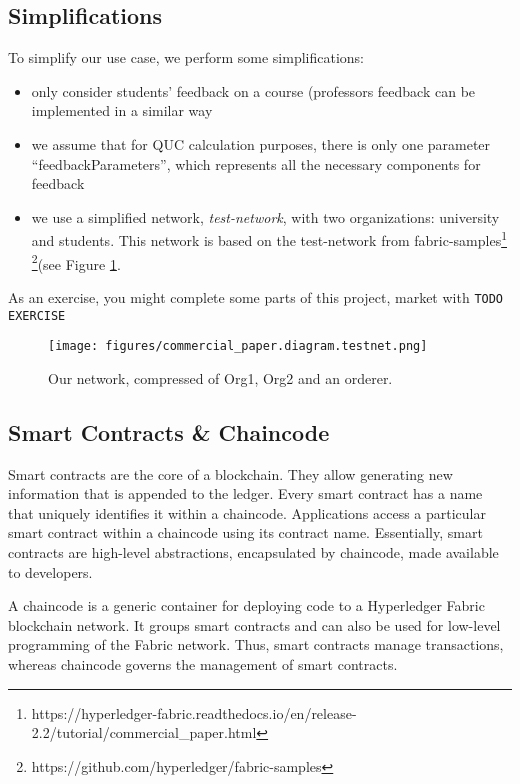 \documentclass[12pt,a4paper]{article}
\theoremstyle{definition}
\begin{document}
    \subsection{Simplifications}
    To simplify our use case, we perform some simplifications:

    \begin{itemize}
        \item  only consider students' feedback on a course (professors feedback can be implemented in a similar way
        \item we assume that for QUC calculation purposes, there is only one parameter ``feedbackParameters'', which represents all the necessary components for feedback
        \item we use a simplified network, \emph{test-network}, with two organizations: university and students. This network is based on the test-network from fabric-samples\footnote{https://hyperledger-fabric.readthedocs.io/en/release-2.2/tutorial/commercial\_paper.html} \footnote{https://github.com/hyperledger/fabric-samples}(see Figure \ref{fig:network}.
    \end{itemize}

    As an exercise, you might complete some parts of this project, market with \texttt{TODO EXERCISE}

    \begin{figure}[h]
        \centering
        \texttt{[image: figures/commercial\_paper.diagram.testnet.png]}
        \caption{Our network, compressed of Org1, Org2 and an orderer.}
        \label{fig:network}
    \end{figure}


    \subsection{Smart Contracts \& Chaincode}



    Smart contracts are the core of a blockchain. They allow generating new information that is appended to the ledger. Every smart contract has a name that uniquely identifies it within a chaincode. Applications access a particular smart contract within a chaincode using its contract name. Essentially, smart contracts are high-level abstractions, encapsulated by chaincode, made available to developers.

    A chaincode is a generic container for deploying code to a Hyperledger Fabric blockchain network. It groups smart contracts and can also be used for low-level programming of the Fabric network. Thus, smart contracts manage transactions, whereas chaincode governs the management of smart contracts.
\end{document}
